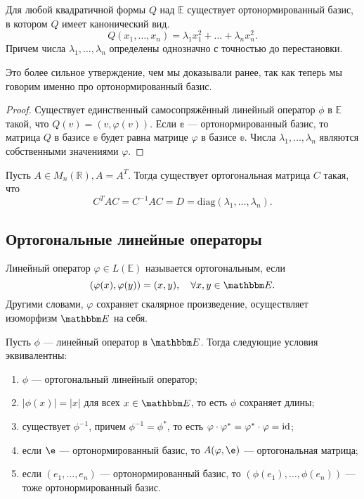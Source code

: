 \begin{Consequence}
	Для любой квадратичной формы $Q$ над $\mathbb{E}$ существует ортонормированный базис, в котором $Q$ имеет канонический вид. 
	$$
	Q(x_1, \ldots, x_n) = \lambda_1 x_1^2 + \ldots + \lambda_n x_n^2.
	$$
	Причем числа $\lambda_1, \ldots, \lambda_n$ определены однозначно с точностью до перестановки.
\end{Consequence}

Это более сильное утверждение, чем мы доказывали ранее, так как теперь мы говорим именно про ортонормированный базис.

\begin{proof}
	Существует единственный самосопряжённый линейный оператор $\phi$ в $\mathbb{E}$ такой, что $Q(v) = (v, \varphi(v))$. Если $\mathbb{e}$ --- ортонормированный базис, то матрица $Q$ в базисе $\mathbb{e}$ будет равна матрице $\varphi$ в базисе $\mathbb{e}$. Числа $\lambda_1, \ldots, \lambda_n$ являются собственными значениями $\varphi$. 
\end{proof}

\begin{Consequence}
	Пусть $A\in M_n(\mathbb{R}), A = A^T$. Тогда существует ортогональная матрица $C$ такая, что 
	$$
	C^TAC = C^{-1} AC = D = \mathrm{diag}(\lambda_1, \ldots, \lambda_n).
	$$
\end{Consequence}

\subsection{Ортогональные линейные операторы}

\begin{Def}
	Линейный оператор $\varphi \in L(\mathbb{E})$ называется ортогональным, если
	$$
	(\varphi(x), \varphi(y)) = (x,y), \quad \forall x, y \in \E.
	$$
	Другими словами, $\varphi$ сохраняет скалярное произведение, осуществляет изоморфизм $\E$ на себя.
\end{Def}

\begin{Suggestion}
Пусть $\phi$ --- линейный оператор в $\E$. Тогда следующие условия эквивалентны:
\begin{enumerate}
\item $\phi$ --- ортогональный линейный оператор;
\item $|\phi(x)| = |x|$ для всех $x \in \E$, то есть $\phi$ сохраняет длины;
\item существует $\phi^{-1}$, причем $\phi^{-1} = \phi^*$, то есть $\varphi \cdot \varphi^* = \varphi^*\cdot \varphi = \mathrm{id}$;
\item если $\e$ --- ортонормированный базис, то $A(\phi, \e)$ --- ортогональная матрица;
\item если $(e_1, \ldots, e_n)$ --- ортонормированный базис, то $(\phi(e_1), \ldots, \phi(e_n))$ --- тоже ортонормированный базис.
\end{enumerate}
\end{Suggestion}

